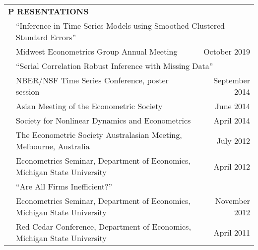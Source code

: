 \documentclass[10pt]{article}
\begin{document}
\begin{center}
\begin{tabular}{llllr}
\multicolumn{5}{l}{{\Large \textbf{P}}
\textbf{RESENTATIONS}}\vspace{0.1cm}\\
&\multicolumn{4}{l}{\textquotedblleft Inference in Time Series Models using Smoothed Clustered Standard Errors\textquotedblright } \\
\multicolumn{1}{l}{} &  \multicolumn{3}{l}{
Midwest Econometrics Group Annual Meeting} &\multicolumn{1}{r}{October 2019}\vspace{0.2cm}\\
&\multicolumn{4}{l}{\textquotedblleft Serial Correlation
Robust Inference with Missing Data\textquotedblright } \\
\multicolumn{1}{l}{} &  \multicolumn{3}{l}{
NBER/NSF Time Series Conference, poster session} &\multicolumn{1}{r}{September 2014}\\
\multicolumn{1}{l}{} & \multicolumn{3}{l}{
Asian Meeting of the Econometric Society} &\multicolumn{1}{r}{June 2014}\\
\multicolumn{1}{l}{} &\multicolumn{3}{l}{
Society for Nonlinear Dynamics and Econometrics} &\multicolumn{1}{r}{April 2014}\\
\multicolumn{1}{l}{} & \multicolumn{3}{l}{
The Econometric Society Australasian Meeting, Melbourne, Australia} &\multicolumn{1}{r}{July 2012}\\
\multicolumn{1}{l}{} &\multicolumn{3}{l}{
Econometrics Seminar, Department of Economics, Michigan State University} &\multicolumn{1}{r}{April 2012}\vspace{0.2cm}\\
& \multicolumn{4}{l}{ \textquotedblleft Are All Firms Inefficient?\textquotedblright}\\
\multicolumn{1}{l}{} & \multicolumn{3}{l}{
Econometrics Seminar, Department of Economics, Michigan State University} &\multicolumn{1}{r}{November 2012}\\
\multicolumn{1}{l}{} & \multicolumn{3}{l}{
Red Cedar Conference, Department of Economics, Michigan State University} &\multicolumn{1}{r}{April 2011} \\
%
%

\end{tabular}
\end{center}
\end{document}

